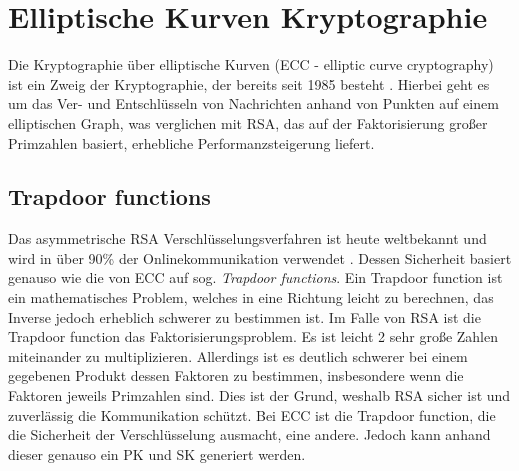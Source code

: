\documentclass[
	fontsize=11pt,
	headings=small,
	parskip=half,           %
	bibliography=totoc,
	numbers=noenddot,       %
	open=any,               %
]{scrreprt}
\begin{document}
\section{Elliptische Kurven Kryptographie}
\label{sec:ecc}
Die Kryptographie über elliptische Kurven (ECC - elliptic curve cryptography) ist ein Zweig der Kryptographie, der bereits seit 1985 besteht \cite{ecc-miller1985use}. Hierbei geht es um das Ver- und Entschlüsseln von Nachrichten anhand von Punkten auf einem elliptischen Graph, was verglichen mit RSA, das auf der Faktorisierung großer Primzahlen basiert, erhebliche Performanzsteigerung liefert.

\subsection{Trapdoor functions}
Das asymmetrische RSA Verschlüsselungsverfahren ist heute weltbekannt und wird in über 90\% der Onlinekommunikation verwendet \cite{ecc-rsa_amount}. Dessen Sicherheit basiert genauso wie die von ECC auf sog.  \textit{Trapdoor functions}. Ein Trapdoor function ist ein mathematisches Problem, welches in eine Richtung leicht zu berechnen, das Inverse jedoch erheblich schwerer zu bestimmen ist. Im Falle von RSA ist die Trapdoor function das Faktorisierungsproblem. Es ist leicht 2 sehr große Zahlen miteinander zu multiplizieren. Allerdings ist es deutlich schwerer bei einem gegebenen Produkt dessen Faktoren zu bestimmen, insbesondere wenn die Faktoren jeweils Primzahlen sind. Dies ist der Grund, weshalb RSA sicher ist und zuverlässig die Kommunikation schützt. Bei ECC ist die Trapdoor function, die die Sicherheit der Verschlüsselung ausmacht, eine andere. Jedoch kann anhand dieser genauso ein PK und SK generiert werden.
\end{document}
